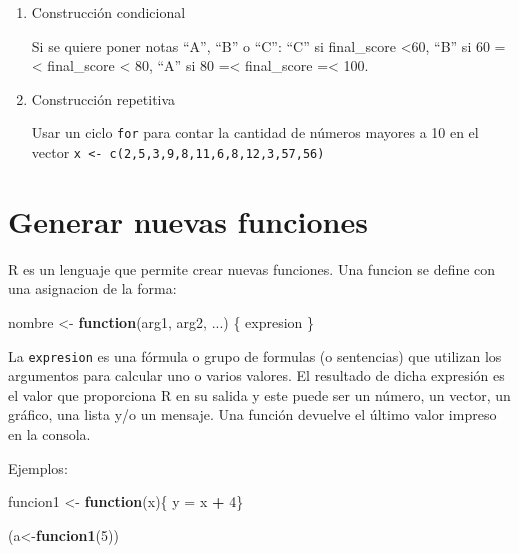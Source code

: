 \documentclass[]{book}
\newenvironment{Shaded}{\begin{snugshade}}{\end{snugshade}}
\newcommand{\KeywordTok}[1]{\textcolor[rgb]{0.13,0.29,0.53}{\textbf{#1}}}
\newcommand{\DecValTok}[1]{\textcolor[rgb]{0.00,0.00,0.81}{#1}}
\newcommand{\StringTok}[1]{\textcolor[rgb]{0.31,0.60,0.02}{#1}}
\newcommand{\ControlFlowTok}[1]{\textcolor[rgb]{0.13,0.29,0.53}{\textbf{#1}}}
\newcommand{\OperatorTok}[1]{\textcolor[rgb]{0.81,0.36,0.00}{\textbf{#1}}}
\newcommand{\NormalTok}[1]{#1}
\begin{document}
\begin{boxeda}
\begin{enumerate}
\def\labelenumi{\arabic{enumi}.}
\item
  Construcción condicional

  Si se quiere poner notas ``A'', ``B'' o ``C'': ``C'' si final\_score
  \textless{}60, ``B'' si 60 =\textless{} final\_score \textless{} 80,
  ``A'' si 80 =\textless{} final\_score =\textless{} 100.
\item
  Construcción repetitiva

  Usar un ciclo \texttt{for} para contar la cantidad de números mayores
  a 10 en el vector
  \texttt{x\ \textless{}-\ c(2,5,3,9,8,11,6,8,12,3,57,56)}
\end{enumerate}
\end{boxeda}

\chapter{Generar nuevas funciones}\label{generar-nuevas-funciones}

R es un lenguaje que permite crear nuevas funciones. Una funcion se
define con una asignacion de la forma:

\begin{Shaded}
\begin{Highlighting}[]
\NormalTok{nombre <-}\StringTok{ }\ControlFlowTok{function}\NormalTok{(arg1, arg2, ...) \{}
\NormalTok{   expresion}
\NormalTok{ \}}
\end{Highlighting}
\end{Shaded}

La \texttt{expresion} es una fórmula o grupo de formulas (o sentencias)
que utilizan los argumentos para calcular uno o varios valores. El
resultado de dicha expresión es el valor que proporciona R en su salida
y este puede ser un número, un vector, un gráfico, una lista y/o un
mensaje. Una función devuelve el último valor impreso en la consola.

Ejemplos:

\begin{Shaded}
\begin{Highlighting}[]
\NormalTok{funcion1 <-}\StringTok{ }\ControlFlowTok{function}\NormalTok{(x)\{ y =}\StringTok{ }\NormalTok{x }\OperatorTok{+}\StringTok{ }\DecValTok{4}\NormalTok{\}}

\NormalTok{(a<-}\KeywordTok{funcion1}\NormalTok{(}\DecValTok{5}\NormalTok{))}
\end{Highlighting}
\end{Shaded}
\end{document}

